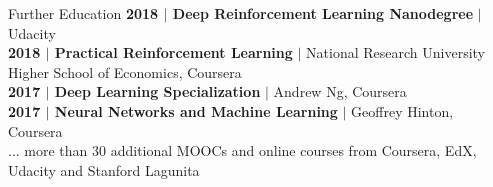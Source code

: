 \documentclass{resume} %
\begin{document}
\begin{rSection}{Further Education}
{\textbf{2018 $|$ Deep Reinforcement Learning Nanodegree}  $|$  Udacity}\\
{\textbf{2018 $|$ Practical Reinforcement Learning}  $|$  National Research University Higher School of Economics, Coursera} \\
{\textbf{2017 $|$ Deep Learning Specialization}  $|$  Andrew Ng, Coursera}\\
{\textbf{2017 $|$ Neural Networks and Machine Learning}  $|$  Geoffrey Hinton, Coursera}\\
{... more than 30 additional MOOCs and online courses from Coursera, EdX, Udacity and Stanford Lagunita}
\end{rSection}



\end{document}
